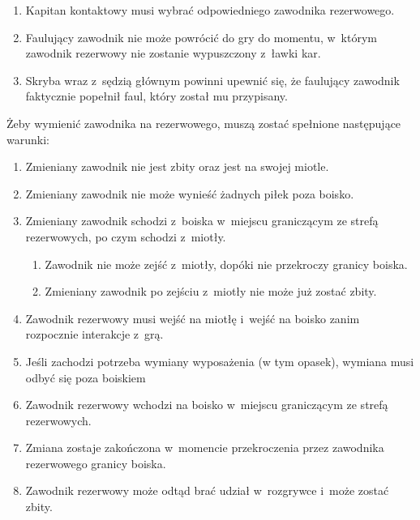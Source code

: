 \documentclass[12pt,a4paper]{article}
\renewcommand{\subsubsection}[1]{
  \oldsubsubsection{#1}%
  \leftskip1.3cm
}
\begin{document}
\begin{enumerate}
\begin{enumerate}
		            \begin{enumerate}
			            \item
			                  Kapitan kontaktowy musi wybrać odpowiedniego zawodnika
			                  rezerwowego.
			            \item
			                  Faulujący zawodnik nie może powrócić do gry do momentu, w~którym
			                  zawodnik rezerwowy nie zostanie wypuszczony z~ławki kar.
			            \item
			                  Skryba wraz z~sędzią głównym powinni upewnić się, że faulujący
			                  zawodnik faktycznie popełnił faul, który został mu przypisany.
		            \end{enumerate}
	      \end{enumerate}
\end{enumerate}

\subsubsection{Procedura zmiany}

Żeby wymienić zawodnika na rezerwowego, muszą zostać spełnione
następujące warunki:

\begin{enumerate}
	\item
	      Zmieniany zawodnik nie jest zbity oraz jest na swojej miotle.
	\item
	      Zmieniany zawodnik nie może wynieść żadnych piłek poza boisko.
	\item
	      Zmieniany zawodnik schodzi z~boiska w~miejscu graniczącym ze strefą
	      rezerwowych, po czym schodzi z~miotły.

	      \begin{enumerate}
		      \item
		            Zawodnik nie może zejść z~miotły, dopóki nie przekroczy granicy
		            boiska.
		      \item
		            Zmieniany zawodnik po zejściu z~miotły nie może już zostać zbity.
	      \end{enumerate}
	\item
	      Zawodnik rezerwowy musi wejść na miotłę i~wejść na boisko zanim
	      rozpocznie interakcje z~grą.
	\item
	      Jeśli zachodzi potrzeba wymiany wyposażenia (w tym opasek), wymiana
	      musi odbyć się poza boiskiem
	\item
	      Zawodnik rezerwowy wchodzi na boisko w~miejscu graniczącym ze strefą
	      rezerwowych.
	\item
	      Zmiana zostaje zakończona w~momencie przekroczenia przez zawodnika
	      rezerwowego granicy boiska.
	\item
	      Zawodnik rezerwowy może odtąd brać udział w~rozgrywce i~może zostać
	      zbity.
\end{enumerate}
\end{document}
